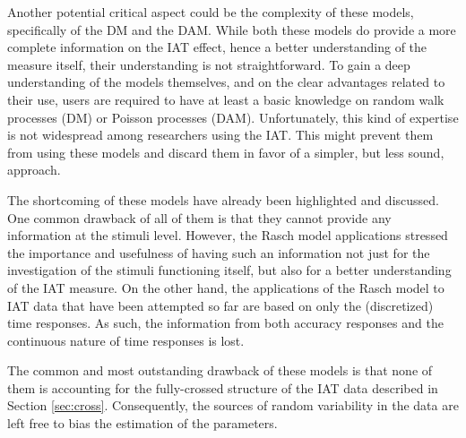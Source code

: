 \documentclass[12pt]{book}
\begin{document}
Another potential critical aspect could be the complexity of these models, specifically of the DM and the DAM. 
	While both these models do provide a more complete information on the IAT effect, hence a better understanding of the measure itself, their understanding is not straightforward. To gain a deep understanding of the models themselves, and on the clear advantages related to their use, users are required to have at least a basic knowledge on random walk processes (DM) or Poisson processes (DAM). 
	Unfortunately, this kind of expertise is not widespread among researchers using the IAT. This might prevent them from using these models and discard them in favor of a simpler, but less sound, approach.

The shortcoming of these models have already been highlighted and discussed. One common drawback of all of them is that they cannot provide any information at the stimuli level. 
However, the Rasch model applications stressed the importance and usefulness of having such an information not just for the investigation of the stimuli functioning itself, but also for a better understanding of the IAT measure. 
On the other hand, the applications of the Rasch model to IAT data that have been attempted so far are based on only the (discretized) time responses. As such, the information from both accuracy responses and the continuous nature of time responses is lost. 

The common and most outstanding drawback of these models is that none of them is accounting for the fully-crossed structure of the IAT data described in Section \ref{sec:cross}. 
Consequently, the sources of random variability in the data are left free to bias the estimation of the parameters.

\newpage
% 
%
\end{document}
